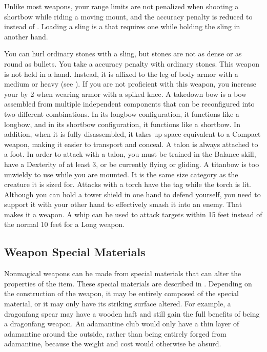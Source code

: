      Unlike most  weapons, your range limits are not penalized when shooting a shortbow while riding a moving mount, and the accuracy penalty is reduced to  instead of .
     Loading a sling is a  that requires one  while holding the sling in another hand.
    \par You can hurl ordinary stones with a sling, but stones are not as dense or as round as bullets. You take a  accuracy penalty with ordinary stones.
     This weapon is not held in a hand.
    Instead, it is affixed to the leg of body armor with a medium or heavy  (see ).
    If you are not proficient with this weapon, you increase your  by 2 when wearing armor with a spiked knee.
     A takedown bow is a bow assembled from multiple independent components that can be reconfigured into two different combinations.
    In its longbow configuration, it functions like a longbow, and in its shortbow configuration, it functions like a shortbow.
    In addition, when it is fully disassembled, it takes up space equivalent to a Compact weapon, making it easier to transport and conceal.
     A talon is always attached to a foot.
    In order to attack with a talon, you must be trained in the Balance skill, have a Dexterity of at least 3, or be currently flying or gliding.
     A titanbow is too unwieldy to use while you are mounted.
    It is the same size category as the creature it is sized for.
     Attacks with a torch have the \atFire tag while the torch is lit.
     Although you can hold a tower shield in one hand to defend yourself, you need to support it with your other hand to effectively smash it into an enemy.
    That makes it a  weapon.
     A whip can be used to attack targets within 15 feet instead of the normal 10 feet for a Long weapon.

  \subsection{Weapon Special Materials}\label{Weapon Special Materials}
    Nonmagical weapons can be made from special materials that can alter the properties of the item.
    These special materials are described in .
    Depending on the construction of the weapon, it may be entirely composed of the special material, or it may only have its striking surface altered.
    For example, a dragonfang spear may have a wooden haft and still gain the full benefits of being a dragonfang weapon.
    An adamantine club would only have a thin layer of adamantine around the outside, rather than being entirely forged from adamantine, because the weight and cost would otherwise be absurd.

